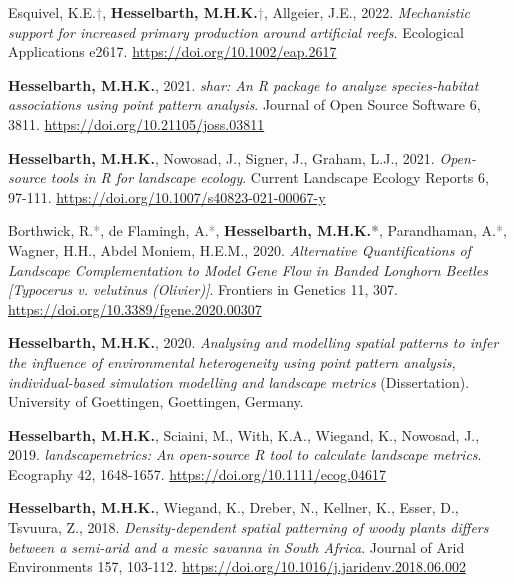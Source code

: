 \documentclass[10pt, hidelinks]{report}
\begin{document}
\begin{hangparas}{7.5mm}{1}


Esquivel, K.E.\textcolor{grey}{†}, \textbf{Hesselbarth, M.H.K.}\textcolor{grey}{†}, Allgeier, J.E., 2022. \textit{Mechanistic support for increased primary production around artificial reefs}. Ecological Applications e2617. \url{https://doi.org/10.1002/eap.2617}

\textbf{Hesselbarth, M.H.K.}, 2021. \textit{shar: An R package to analyze species-habitat associations using point pattern analysis}. Journal of Open Source Software 6, 3811. \url{https://doi.org/10.21105/joss.03811}

\textbf{Hesselbarth, M.H.K.}, Nowosad, J., Signer, J., Graham, L.J., 2021. \textit{Open-source tools in R for landscape ecology}. Current Landscape Ecology Reports 6, 97-111. \url{https://doi.org/10.1007/s40823-021-00067-y}

Borthwick, R.\textcolor{grey}{*}, de Flamingh, A.\textcolor{grey}{*}, \textbf{Hesselbarth, M.H.K.\textcolor{grey}{*}}, Parandhaman, A.\textcolor{grey}{*}, Wagner, H.H., Abdel Moniem, H.E.M., 2020. \textit{Alternative Quantifications of Landscape Complementation to Model Gene Flow in Banded Longhorn Beetles [Typocerus v. velutinus (Olivier)]}. Frontiers in Genetics 11, 307. \url{https://doi.org/10.3389/fgene.2020.00307}

\textbf{Hesselbarth, M.H.K.}, 2020. \textit{Analysing and modelling spatial patterns to infer the influence of environmental heterogeneity using point pattern analysis, individual-based simulation modelling and landscape metrics} (Dissertation). University of Goettingen, Goettingen, Germany.

\textbf{Hesselbarth, M.H.K.}, Sciaini, M., With, K.A., Wiegand, K., Nowosad, J., 2019. \textit{landscapemetrics: An open-source R tool to calculate landscape metrics}. Ecography 42, 1648-1657. \url{https://doi.org/10.1111/ecog.04617}

\textbf{Hesselbarth, M.H.K.}, Wiegand, K., Dreber, N., Kellner, K., Esser, D., Tsvuura, Z., 2018. \textit{Density-dependent spatial patterning of woody plants differs between a semi-arid and a mesic savanna in South Africa}. Journal of Arid Environments 157, 103-112. \url{https://doi.org/10.1016/j.jaridenv.2018.06.002}

\end{hangparas}
\end{document}
